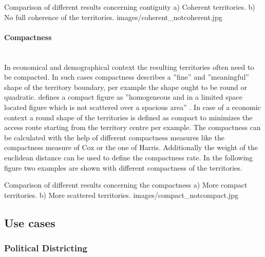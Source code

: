 \begin{figureOwn}{Comparison of different results concerning contiguity a) Coherent territories. b) No full coherence of the territories. }{images/coherent_notcoherent.jpg}\end{figureOwn} 

\paragraph{Compactness}\mbox{} \\

In economical and demographical context the resulting territories often need to be compacted. In such cases compactness describes a ''fine'' and ''meaningful'' shape of the territory boundary, per example the shape ought to be round or quadratic. \citeauthor{young} defines a compact figure as ''homogeneous and in a limited space located figure which is not scattered over a spacious area'' \cite{young}. In case of a economic context a round shape of the territories is defined as compact to minimizes the access route starting from the territory centre per example. The compactness can be calculated with the help of different compactness measures like the compactness measure of Cox or the one of Harris. Additionally the weight of the euclidean distance can be used to define the compactness rate. In the following figure two examples are shown with different compactness of the territories.

\begin{figureOwn}{Comparison of different results concerning the compactness a) More compact territories. b) More scattered territories. }{images/compact_notcompact.jpg}\end{figureOwn} 


\subsection{Use cases}

\subsubsection{Political Districting}

